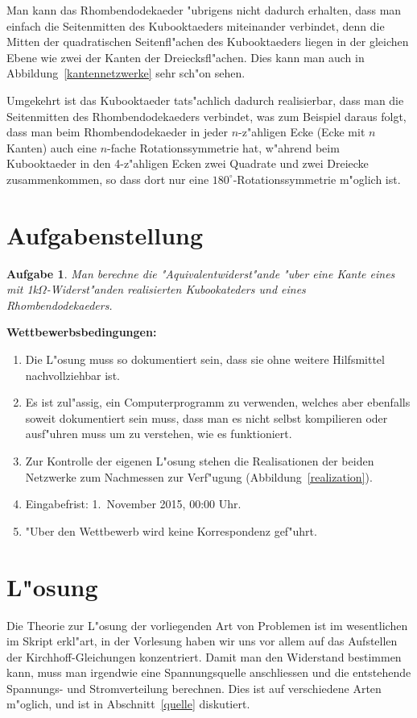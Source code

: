 \documentclass[a4paper,12pt]{article}
\begin{document}
Man kann das Rhombendodekaeder "ubrigens nicht dadurch erhalten, dass man
einfach die Seitenmitten des Kubooktaeders miteinander verbindet, denn die
Mitten der quadratischen Seitenfl"achen des Kubooktaeders liegen in der
gleichen Ebene wie zwei der Kanten der Dreiecksfl"achen.
Dies kann man auch in Abbildung~\ref{kantennetzwerke} sehr sch"on sehen.

Umgekehrt ist das Kubooktaeder tats"achlich dadurch realisierbar, dass
man die Seitenmitten des Rhombendodekaeders verbindet, was zum Beispiel
daraus folgt, dass man beim Rhombendodekaeder in jeder $n$-z"ahligen
Ecke (Ecke mit $n$ Kanten) auch eine $n$-fache Rotationssymmetrie hat,
w"ahrend beim Kubooktaeder in den 4-z"ahligen Ecken zwei Quadrate
und zwei Dreiecke zusammenkommen, so dass dort nur eine
$180^\circ$-Rotationssymmetrie m"oglich ist.

\section{Aufgabenstellung}

\newtheorem{aufgabe}{Aufgabe}
\begin{aufgabe}
Man berechne die "Aquivalentwiderst"ande "uber eine Kante eines mit
1k$\Omega$-Widerst"anden realisierten Kubookateders und eines
Rhombendodekaeders.
\end{aufgabe}

{\parindent0pt \bf Wettbewerbsbedingungen:}
\begin{enumerate}
\item
Die L"osung muss so dokumentiert sein, dass sie ohne weitere Hilfsmittel
nachvollziehbar ist.
\item
Es ist zul"assig, ein Computerprogramm zu verwenden, welches aber ebenfalls
soweit dokumentiert sein muss, dass man es nicht selbst kompilieren oder
ausf"uhren muss um zu verstehen, wie es funktioniert.
\item
Zur Kontrolle der eigenen L"osung stehen die Realisationen der beiden
Netzwerke zum Nachmessen zur Verf"ugung (Abbildung~\ref{realization}).
\item
Eingabefrist: 1.~November 2015, 00:00 Uhr.
\item
"Uber den Wettbewerb wird keine Korrespondenz gef"uhrt.
\end{enumerate}

\section{L"osung}
Die Theorie zur L"osung der vorliegenden Art von Problemen ist
im wesentlichen im Skript erkl"art, in der Vorlesung haben wir
uns vor allem auf das Aufstellen der Kirchhoff-Gleichungen 
konzentriert.
Damit man den Widerstand bestimmen kann, muss man irgendwie eine
Spannungsquelle anschliessen und die entstehende Spannungs- und Stromverteilung
berechnen.
Dies ist auf verschiedene Arten m"oglich, und ist in Abschnitt~\ref{quelle}
diskutiert.
\end{document}
